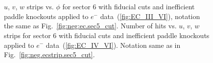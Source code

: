 \begin{figure}[!ht]
  \centering
   \quad
  \\
   \\

      \caption { $u$, $v$, $w$ strips vs. $\phi$ for sector 6 with fiducial cuts and inefficient paddle knockouts applied to $e^-$ data~(\ref{fig:EC_III_VI}), notation the same as Fig.~\ref{fig:neg:ec.sec5_cut}. Number of hits vs.  $u$, $v$, $w$ strips for sector 6 with fiducial cuts and inefficient paddle knockouts applied to $e^-$ data~(\ref{fig:EC_IV_VI}). Notation same as in Fig.~\ref{fig:neg.ecstrip.sec5_cut}.}
        \label{fig:EC_cut_VI}
\end{figure}

\FloatBarrier

